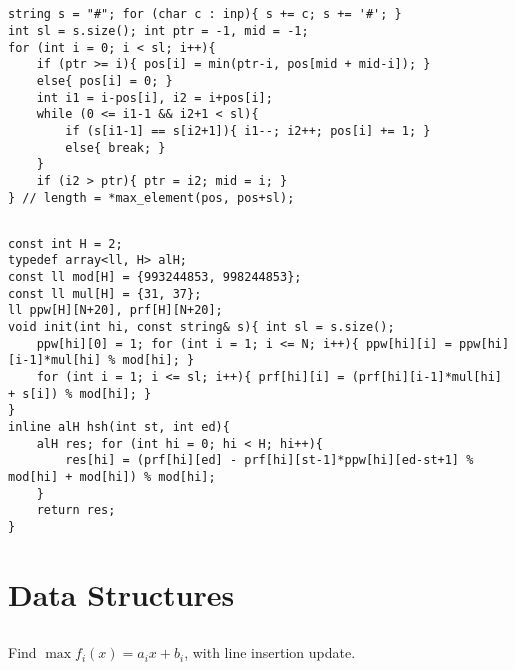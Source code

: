 \documentclass[landscape, 8pt, a4paper, oneside, twocolumn]{extarticle}
\begin{document}
\subsection{}
\begin{verbatim}
string s = "#"; for (char c : inp){ s += c; s += '#'; }
int sl = s.size(); int ptr = -1, mid = -1;
for (int i = 0; i < sl; i++){
    if (ptr >= i){ pos[i] = min(ptr-i, pos[mid + mid-i]); }
    else{ pos[i] = 0; }
    int i1 = i-pos[i], i2 = i+pos[i];
    while (0 <= i1-1 && i2+1 < sl){
        if (s[i1-1] == s[i2+1]){ i1--; i2++; pos[i] += 1; }
        else{ break; }
    }
    if (i2 > ptr){ ptr = i2; mid = i; }
} // length = *max_element(pos, pos+sl);
\end{verbatim}
\subsection{}
\begin{verbatim}
const int H = 2;
typedef array<ll, H> alH;
const ll mod[H] = {993244853, 998244853};
const ll mul[H] = {31, 37};
ll ppw[H][N+20], prf[H][N+20];
void init(int hi, const string& s){ int sl = s.size();
    ppw[hi][0] = 1; for (int i = 1; i <= N; i++){ ppw[hi][i] = ppw[hi][i-1]*mul[hi] % mod[hi]; }
    for (int i = 1; i <= sl; i++){ prf[hi][i] = (prf[hi][i-1]*mul[hi] + s[i]) % mod[hi]; }
}
inline alH hsh(int st, int ed){
    alH res; for (int hi = 0; hi < H; hi++){
        res[hi] = (prf[hi][ed] - prf[hi][st-1]*ppw[hi][ed-st+1] % mod[hi] + mod[hi]) % mod[hi];
    }
    return res;
}
\end{verbatim}
\section{Data Structures}
\subsection{}
Find $\max f_i(x) = a_ix + b_i$, with line insertion update.
\end{document}
